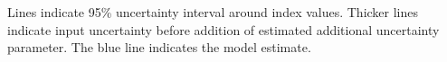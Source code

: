 \documentclass[12pt,]{article}
\begin{document}
\FloatBarrier

\vspace{2.5cm}

\noindent

\begin{minipage}{\linewidth}%
\label{fig:index2_cpuefit_WCGBTS}%
\begin{centering}
Lines indicate 95\% uncertainty interval around index values. Thicker lines indicate input uncertainty before addition of estimated additional uncertainty parameter. The blue line indicates the model estimate.
\end{centering}
\end{minipage}

\FloatBarrier
\end{document}
